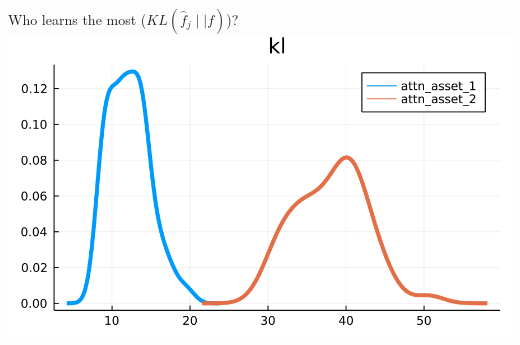 \documentclass[
  ignorenonframetext,
]{beamer}
\begin{document}
\begin{frame}{Who learns the most (\(KL(\hat f_j \mid\mid f)\))?}
\includegraphics[width=0.4\paperheight]{complexity_files/figure-beamer/unnamed-chunk-20-4}
\end{frame}
\end{document}
